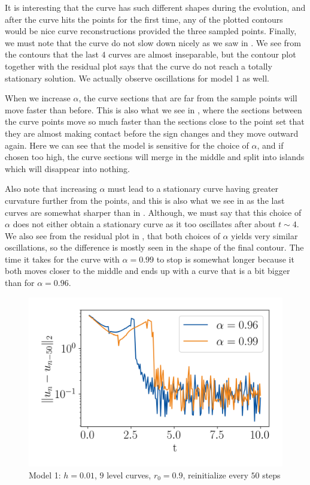 It is interesting that the curve has such different shapes during the evolution, and after the curve hits the points for the first time, any of the plotted contours would be nice curve reconstructions provided the three sampled points. Finally, we must note that the curve do not slow down nicely as we saw in . We see from the contours that the last $4$ curves are almost inseparable, but the contour plot together with the residual plot says that the curve do not reach a totally stationary solution. We actually observe oscillations for model 1 as well.

When we increase $\alpha$, the curve sections that are far from the sample points will move faster than before. This is also what we see in , where the sections between the curve points move so much faster than the sections close to the point set that they are almost making contact before the sign changes and they move outward again. Here we can see that the model is sensitive for the choice of $\alpha$, and if chosen too high, the curve sections will merge in the middle and split into islands which will disappear into nothing.

Also note that increasing $\alpha$ must lead to a stationary curve having greater curvature further from the points, and this is also what we see in  as the last curves are somewhat sharper than in . Although, we must say that this choice of $\alpha$ does not either obtain a stationary curve as it too oscillates after about $t\sim 4$. We also see from the residual plot in , that both choices of $\alpha$ yields very similar oscillations, so the difference is mostly seen in the shape of the final contour. The time it takes for the curve with $\alpha=0.99$ to stop is somewhat longer because it both moves closer to the middle and ends up with a curve that is a bit bigger than for $\alpha=0.96$.


\begin{figure}
    \centering
    \includegraphics[width=.6\linewidth]{figures/Results/Three-points/model1/a96_a99_res.png}
    \caption[Model 1 - Triangle, Residuals]{Model 1: $h=0.01$, $9$ level curves, $r_0=0.9$, reinitialize every $50$ steps}
    \label{fig:m1-three-res}
\end{figure}

